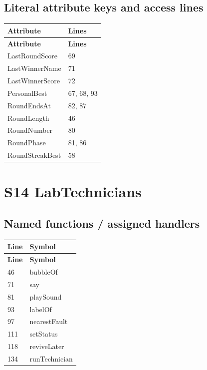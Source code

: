 \subsection{Literal attribute keys and access lines}
\begin{longtable}{p{}p{}}
\toprule
\textbf{Attribute} & \textbf{Lines} \\ \midrule
\endfirsthead
\textbf{Attribute} & \textbf{Lines} \\ \midrule
\endhead
LastRoundScore & 69 \\
LastWinnerName & 71 \\
LastWinnerScore & 72 \\
PersonalBest & 67, 68, 93 \\
RoundEndsAt & 82, 87 \\
RoundLength & 46 \\
RoundNumber & 80 \\
RoundPhase & 81, 86 \\
RoundStreakBest & 58 \\
\bottomrule
\end{longtable}
\section{S14 LabTechnicians}
\subsection{Named functions /\allowbreak{} assigned handlers}
\begin{longtable}{p{}p{}}
\toprule
\textbf{Line} & \textbf{Symbol} \\ \midrule
\endfirsthead
\textbf{Line} & \textbf{Symbol} \\ \midrule
\endhead
46 & bubbleOf \\
71 & say \\
81 & playSound \\
93 & labelOf \\
97 & nearestFault \\
111 & setStatus \\
118 & reviveLater \\
134 & runTechnician \\
\bottomrule
\end{longtable}
